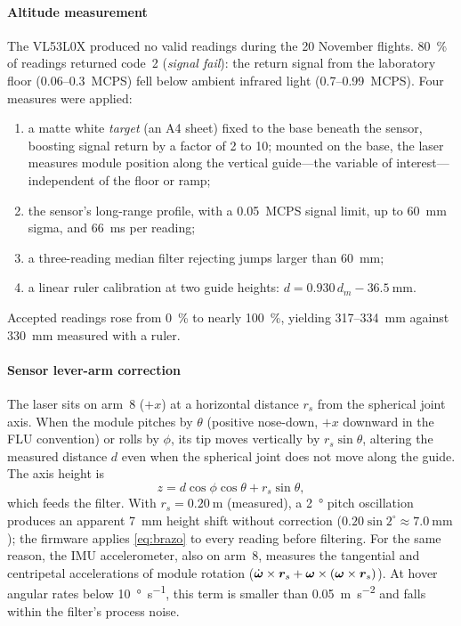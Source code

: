 \paragraph{Altitude measurement} The VL53L0X produced no valid readings during the 20 November flights. \SI{80}{\percent} of readings returned code~2 (\emph{signal fail}): the return signal from the laboratory floor (0.06--\SI{0.3}{MCPS}) fell below ambient infrared light (0.7--\SI{0.99}{MCPS}). Four measures were applied:
\begin{enumerate}[label=(\roman*)]
  \item a matte white \emph{target} (an A4 sheet) fixed to the base beneath the sensor, boosting signal return by a factor of 2 to 10; mounted on the base, the laser measures module position along the vertical guide---the variable of interest---independent of the floor or ramp;
  \item the sensor's long-range profile, with a \SI{0.05}{MCPS} signal limit, up to \SI{60}{\milli\metre} sigma, and \SI{66}{\milli\second} per reading;
  \item a three-reading median filter rejecting jumps larger than \SI{60}{\milli\metre};
  \item a linear ruler calibration at two guide heights: $d=0.930\,d_m-\SI{36.5}{\milli\metre}$.
\end{enumerate}
Accepted readings rose from \SI{0}{\percent} to nearly \SI{100}{\percent}, yielding 317--\SI{334}{\milli\metre} against \SI{330}{\milli\metre} measured with a ruler.

\paragraph{Sensor lever-arm correction} The laser sits on arm~8 ($+x$) at a horizontal distance $r_s$ from the spherical joint axis. When the module pitches by $\theta$ (positive nose-down, $+x$ downward in the FLU convention) or rolls by $\phi$, its tip moves vertically by $r_s\sin\theta$, altering the measured distance $d$ even when the spherical joint does not move along the guide. The axis height is
\begin{equation}
  z=d\cos\phi\cos\theta+r_s\sin\theta ,
  \label{eq:brazo}
\end{equation}
which feeds the filter. With $r_s=\SI{0.20}{\metre}$ (measured), a \SI{2}{\degree} pitch oscillation produces an apparent \SI{7}{\milli\metre} height shift without correction ($0.20\sin 2^\circ\approx\SI{7.0}{\milli\metre}$); the firmware applies \eqref{eq:brazo} to every reading before filtering. For the same reason, the IMU accelerometer, also on arm~8, measures the tangential and centripetal accelerations of module rotation ($\dot{\bm{\omega}}\times\bm{r}_s+\bm{\omega}\times(\bm{\omega}\times\bm{r}_s)$). At hover angular rates below \SI{10}{\degree\per\second}, this term is smaller than \SI{0.05}{\metre\per\second\squared} and falls within the filter's process noise.


